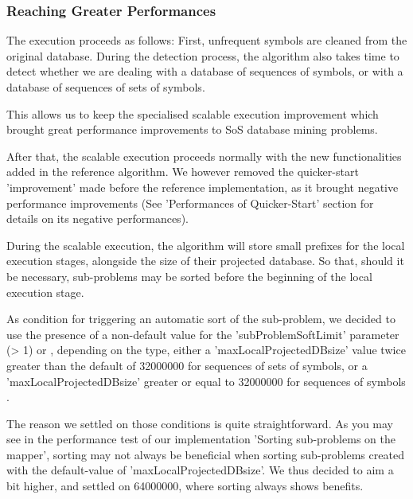 \documentclass{eplmastersthesis}
\begin{document}
\subsubsection{Reaching Greater Performances}

The execution proceeds as follows: First, unfrequent symbols are cleaned from the original database. During the detection process, the algorithm also takes time to detect whether we are dealing with a database of sequences of symbols, or with a database of sequences of sets of symbols.\newline

This allows us to keep the specialised scalable execution improvement which brought great performance improvements to SoS database mining problems. \newline

After that, the scalable execution proceeds normally with the new functionalities added in the reference algorithm. We however removed the quicker-start 'improvement' made before the reference implementation, as it brought negative performance improvements (See 'Performances of Quicker-Start' section for details on its negative performances). \newline

During the scalable execution, the algorithm will store small prefixes for the local execution stages, alongside the size of their projected database. So that, should it be necessary, sub-problems may be sorted before the beginning of the local execution stage. \newline

As condition for triggering an automatic sort of the sub-problem, we decided to use the presence of a non-default value for the 'subProblemSoftLimit' parameter (> 1) or , depending on the type, either a 'maxLocalProjectedDBsize' value twice greater than the default of 32000000 for sequences of sets of symbols, or a 'maxLocalProjectedDBsize' greater or equal to 32000000 for sequences of symbols . \newline

The reason we settled on those conditions is quite straightforward. As you may see in the performance test of our implementation 'Sorting sub-problems on the mapper', sorting may not always be beneficial when sorting sub-problems created with the default-value of 'maxLocalProjectedDBsize'. We thus decided to aim a bit higher, and settled on 64000000, where sorting always shows benefits. \newline
\end{document}
